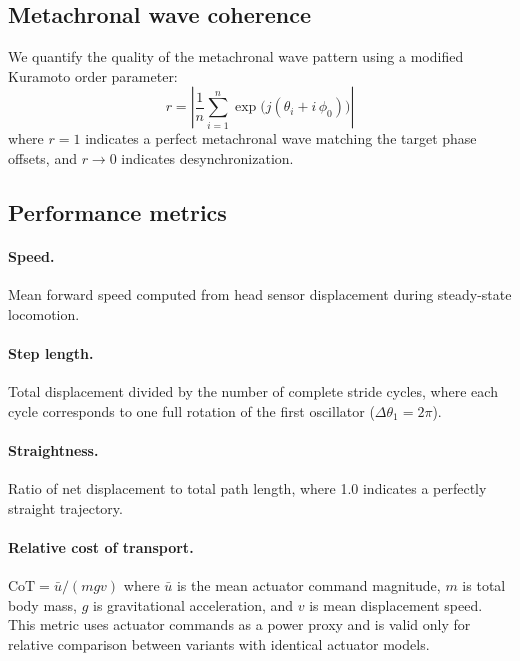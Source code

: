 \documentclass[12pt]{article}
\begin{document}
\subsection{Metachronal wave coherence}
\label{sec:coherence}

We quantify the quality of the metachronal wave pattern using a
modified Kuramoto order parameter:
\begin{equation}
r = \left| \frac{1}{n} \sum_{i=1}^{n}
    \exp\!\big(j(\theta_i + i\,\phi_0)\big) \right|
\label{eq:coherence}
\end{equation}
where $r = 1$ indicates a perfect metachronal wave matching the target
phase offsets, and $r \to 0$ indicates desynchronization.

\subsection{Performance metrics}
\label{sec:metrics}

\paragraph{Speed.}
Mean forward speed computed from head sensor displacement during
steady-state locomotion.

\paragraph{Step length.}
Total displacement divided by the number of complete stride cycles,
where each cycle corresponds to one full rotation of the first
oscillator ($\Delta\theta_1 = 2\pi$).

\paragraph{Straightness.}
Ratio of net displacement to total path length, where 1.0 indicates
a perfectly straight trajectory.

\paragraph{Relative cost of transport.}
$\text{CoT} = \bar{u} / (m g v)$ where $\bar{u}$ is the
mean actuator command magnitude, $m$ is total body mass, $g$ is
gravitational acceleration, and $v$ is mean displacement speed.
This metric uses actuator commands as a power proxy and is valid only
for relative comparison between variants with identical actuator models.
\end{document}

